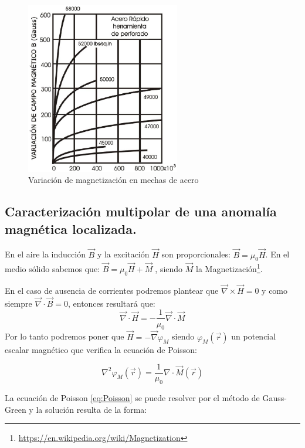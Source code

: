 \begin{figure}[H]
    \centering
    \includegraphics[width=0.6\textwidth]{./Figures/fig55}
	\caption{Variación de magnetización en mechas de acero}
	\label{fig:55}
\end{figure}


\subsection{Caracterización multipolar de una anomalía magnética localizada.}
En el aire la inducción $\vec{B}$ y la excitación $\vec{H}$ son proporcionales: $\vec{B} = \mu_{0}\vec{H}$. En el medio sólido sabemos que: $\vec{B} = \mu_{0}\vec{H} + \vec{M}\;$, siendo $\vec{M}$ la Magnetización\footnote{\url{https://en.wikipedia.org/wiki/Magnetization}}. 

En el caso de ausencia de corrientes podremos plantear que $\vec{\nabla}\times\vec{H} = 0$ y como siempre $\vec{\nabla}\cdot\vec{B} = 0$, entonces resultará que:
\begin{equation}
	\label{eq:mediosLIH6}
	\vec{\nabla}\cdot\vec{H} = -\dfrac{1}{\mu_{0}}\vec{\nabla}\cdot\vec{M}
\end{equation}
Por lo tanto podremos poner que $\vec{H} = -\vec{\nabla}\varphi_{M}$ siendo $\varphi_{M}(\vec{r})$ un potencial escalar magnético que verifica la ecuación de Poisson:

\begin{equation}
	\label{eq:Poisson}
	\nabla^2\varphi_{M}(\vec{r}) = \dfrac{1}{\mu_{0}} \nabla \cdot\vec{M}(\vec{r}) 
\end{equation}

La ecuación de Poisson \ref{eq:Poisson} se puede resolver por el método de Gauss-Green \citep{GaussGreen} y la solución resulta de la forma:

